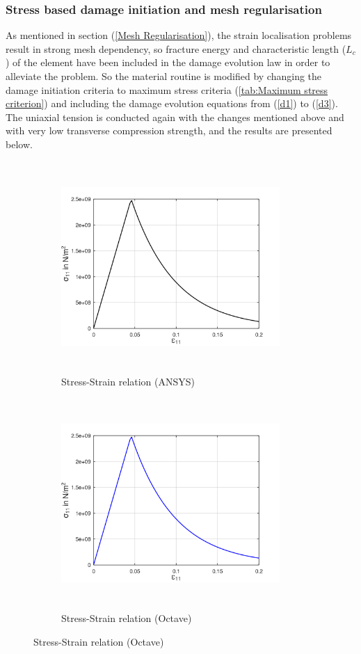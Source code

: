 \documentclass[12pt,openright,twoside]{report}
\begin{document}
\subsubsection{Stress based damage initiation and mesh regularisation}
\indent\indent\indent As mentioned in section (\ref{Mesh Regularisation}), the strain localisation problems result in strong mesh dependency, so fracture energy and characteristic length ($L_{c}$) of the element have been included in the damage evolution law in order to alleviate the problem. So the material routine is modified by changing the damage initiation criteria to maximum stress criteria (\ref{tab:Maximum stress criterion}) and including the damage evolution equations from (\ref{d1}) to (\ref{d3}). The uniaxial tension is conducted again with the changes mentioned above and with very low transverse compression strength, and the results are presented below.
\begin{figure}[htbp!]
     \captionsetup[subfigure]{justification=centering}
     \begin{subfigure}{0.4\textwidth}
         \includegraphics[width=8.3cm,height=8cm,keepaspectratio]{22.StressvsStrain_Ansys.png}
         \caption{Stress-Strain relation (ANSYS)}
         \label{fig:Stress-Strain relation in Ansys2}
     \end{subfigure}
     \hspace{1.8cm}
     \begin{subfigure}{0.4\textwidth}
          \includegraphics[width=8.3cm,height=8cm,keepaspectratio]{22.StressvsStrain_Octave.png}
         \caption{Stress-Strain relation (Octave)}
         \label{fig:Stress-Strain relation Octave2}
     \end{subfigure}
\end{figure}
\end{document}
